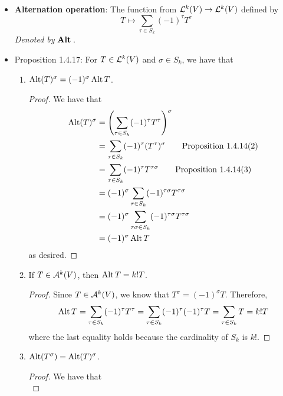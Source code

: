 \documentclass[../notes.tex]{subfiles}
\begin{document}
\begin{itemize}
\begin{itemize}
    \end{itemize}
    \item \textbf{Alternation operation}: The function from $\lin[k]{V}\to\lin[k]{V}$ defined by
    \begin{equation*}
        T \mapsto \sum_{\tau\in S_k}(-1)^\tau T^\tau
    \end{equation*}
    \emph{Denoted by} $\bm{\Alt{}}$.
    \item Proposition 1.4.17: For $T\in\lin[k]{V}$ and $\sigma\in S_k$, we have that
    \begin{enumerate}
        \item $\Alt(T)^\sigma=(-1)^\sigma\Alt T$.
        \begin{proof}
            We have that
            \begin{align*}
                \Alt(T)^\sigma &= \left( \sum_{\tau\in S_k}(-1)^\tau T^\tau \right)^\sigma\\
                &= \sum_{\tau\in S_k}(-1)^\tau(T^\tau)^\sigma\tag*{Proposition 1.4.14(2)}\\
                &= \sum_{\tau\in S_k}(-1)^\tau T^{\tau\sigma}\tag*{Proposition 1.4.14(3)}\\
                &= (-1)^\sigma\sum_{\tau\in S_k}(-1)^{\tau\sigma}T^{\tau\sigma}\\
                &= (-1)^\sigma\sum_{\tau\sigma\in S_k}(-1)^{\tau\sigma}T^{\tau\sigma}\\
                &= (-1)^\sigma\Alt T
            \end{align*}
            as desired.
        \end{proof}
        \item If $T\in\alt[k]{V}$, then $\Alt T=k!T$.
        \begin{proof}
            Since $T\in\alt[k]{V}$, we know that $T^\sigma=(-1)^\sigma T$. Therefore,
            \begin{equation*}
                \Alt T = \sum_{\tau\in S_k}(-1)^\tau T^\tau
                = \sum_{\tau\in S_k}(-1)^\tau(-1)^\tau T
                = \sum_{\tau\in S_k}T
                = k!T
            \end{equation*}
            where the last equality holds because the cardinality of $S_k$ is $k!$.
        \end{proof}
        \item $\Alt(T^\sigma)=\Alt(T)^\sigma$.
        \begin{proof}
            We have that
            \begin{equation*}

\end{equation*}
\end{proof}
\end{enumerate}
\end{itemize}
\end{document}
